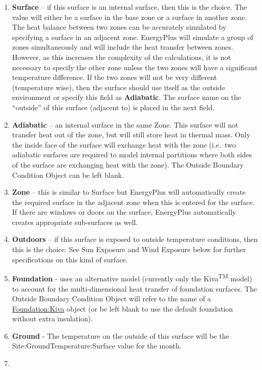 \begin{enumerate}
  \item
    \textbf{Surface} -- if this surface is an internal surface, then this is the choice. The value will either be a surface in the base zone or a surface in another zone. The heat balance between two zones can be accurately simulated by specifying a surface in an adjacent zone. EnergyPlus will simulate a group of zones simultaneously and will include the heat transfer between zones. However, as this increases the complexity of the calculations, it is not necessary to specify the other zone unless the two zones will have a significant temperature difference. If the two zones will not be very different (temperature wise), then the surface should use itself as the outside environment or specify this field as \textbf{Adiabatic}. The surface name on the ``outside'' of this surface (adjacent to) is placed in the next field.
  \item
    \textbf{Adiabatic} -- an internal surface in the same Zone. This surface will not transfer heat out of the zone, but will still store heat in thermal mass. Only the inside face of the surface will exchange heat with the zone (i.e.~two adiabatic surfaces are required to model internal partitions where both sides of the surface are exchanging heat with the zone). The Outside Boundary Condition Object can be left blank.
  \item
    \textbf{Zone} -- this is similar to Surface but EnergyPlus will automatically create the required surface in the adjacent zone when this is entered for the surface. If there are windows or doors on the surface, EnergyPlus automatically creates appropriate sub-surfaces as well.
  \item
    \textbf{Outdoors} -- if this surface is exposed to outside temperature conditions, then this is the choice. See Sun Exposure and Wind Exposure below for further specifications on this kind of surface.
  \item
    \textbf{Foundation} - uses an alternative model (currently only the Kiva\textsuperscript{TM} model) to account for the multi-dimensional heat transfer of foundation surfaces. The Outside Boundary Condition Object will refer to the name of a \hyperref[foundationkiva]{Foundation:Kiva} object (or be left blank to use the default foundation without extra insulation).
  \item
    \textbf{Ground} - The temperature on the outside of this surface will be the Site:GroundTemperature:Surface value for the month.
  \item

\end{enumerate}
